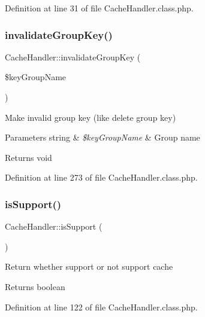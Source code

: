 Definition at line 31 of file Cache\+Handler.\+class.\+php.

\hypertarget{classCacheHandler_a43118f91508ad5695a13f7a332cc9389}{}\label{classCacheHandler_a43118f91508ad5695a13f7a332cc9389} 
\subsubsection{\texorpdfstring{invalidate\+Group\+Key()}{invalidateGroupKey()}}
{\footnotesize\ttfamily Cache\+Handler\+::invalidate\+Group\+Key (\begin{DoxyParamCaption}\item[{}]{\$key\+Group\+Name }\end{DoxyParamCaption})}

Make invalid group key (like delete group key)


\begin{DoxyParams}[1]{Parameters}
string & {\em \$key\+Group\+Name} & Group name \\
\hline
\end{DoxyParams}
\begin{DoxyReturn}{Returns}
void 
\end{DoxyReturn}


Definition at line 273 of file Cache\+Handler.\+class.\+php.

\hypertarget{classCacheHandler_a4c137721670e0e9ce1d60bdd2f7235bb}{}\label{classCacheHandler_a4c137721670e0e9ce1d60bdd2f7235bb} 
\subsubsection{\texorpdfstring{is\+Support()}{isSupport()}}
{\footnotesize\ttfamily Cache\+Handler\+::is\+Support (\begin{DoxyParamCaption}{ }\end{DoxyParamCaption})}

Return whether support or not support cache

\begin{DoxyReturn}{Returns}
boolean 
\end{DoxyReturn}


Definition at line 122 of file Cache\+Handler.\+class.\+php.

